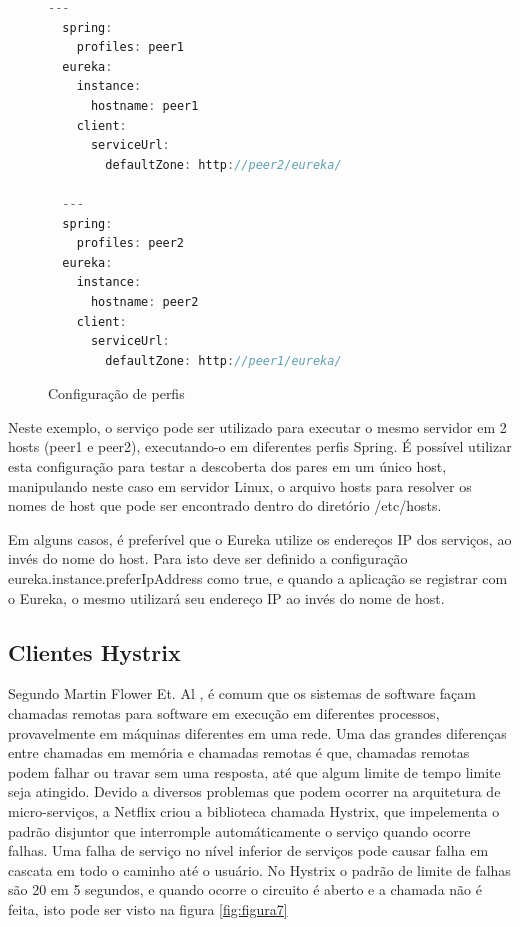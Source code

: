 \documentclass[journal]{IEEEtran}
\begin{document}
\begin{figure}[h]
\centering

\begin{lstlisting}[language=Java]
  ---
  spring:
    profiles: peer1
  eureka:
    instance:
      hostname: peer1
    client:
      serviceUrl:
        defaultZone: http://peer2/eureka/

  ---
  spring:
    profiles: peer2
  eureka:
    instance:
      hostname: peer2
    client:
      serviceUrl:
        defaultZone: http://peer1/eureka/
\end{lstlisting}

\caption{Configuração de perfis}
\label{alg:figuranove}
\end{figure}

Neste exemplo, o serviço pode ser utilizado para executar o mesmo servidor em 2 hosts (peer1 e peer2), executando-o em diferentes perfis Spring. É possível utilizar esta configuração para testar a descoberta dos pares em um único host, manipulando neste caso em servidor Linux, o arquivo hosts para resolver os nomes de host que pode ser encontrado dentro do diretório /etc/hosts.

Em alguns casos, é preferível que o Eureka utilize os endereços IP dos serviços, ao invés do nome do host. Para isto deve ser definido a configuração eureka.instance.preferIpAddress como true, e quando a aplicação se registrar com o Eureka, o mesmo utilizará seu endereço IP ao invés do nome de host.

\subsection{Clientes Hystrix}

Segundo Martin Flower Et. Al \cite{martinfowleretal}, é comum que os sistemas de software façam chamadas remotas para software em execução em diferentes processos, provavelmente em máquinas diferentes em uma rede. Uma das grandes diferenças entre chamadas em memória e chamadas remotas é que, chamadas remotas podem falhar ou travar sem uma resposta, até que algum limite de tempo limite seja atingido. Devido a diversos problemas que podem ocorrer na arquitetura de micro-serviços, a Netflix criou a biblioteca chamada Hystrix, que impelementa o padrão disjuntor que interromple automáticamente o serviço quando ocorre falhas. Uma falha de serviço no nível inferior de serviços pode causar falha em cascata em todo o caminho até o usuário. No Hystrix o padrão de limite de falhas são 20 em 5 segundos, e quando ocorre o circuito é aberto e a chamada não é feita, isto pode ser visto na figura \ref{fig:figura7}
\end{document}
